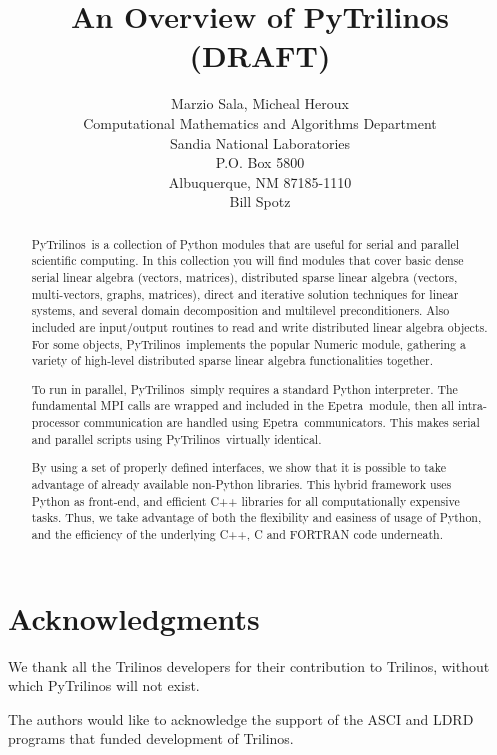 \documentclass[10pt,relax]{SANDreport}
\author{Marzio Sala, Micheal Heroux\\
Computational Mathematics and Algorithms Department \\
Sandia National Laboratories \\
P.O. Box 5800 \\
Albuquerque, NM 87185-1110 \\[10pt]
Bill Spotz \\[10pt]
}
\title{An Overview of PyTrilinos (DRAFT)}
\newcommand{\PyTrilinos}{{PyTrilinos}}
\newcommand{\epetra}{{Epetra}}
\begin{document}
\maketitle

\begin{abstract}
\PyTrilinos\ is a collection of Python modules that are useful for serial and
parallel scientific
computing. In this collection you will find modules that cover basic
dense serial linear algebra (vectors, matrices), 
distributed sparse linear algebra (vectors, multi-vectors, graphs, matrices), 
direct and iterative solution techniques for linear systems, and several
domain decomposition and multilevel
preconditioners. Also included are input/output routines to read and write
distributed linear algebra objects.
For some objects, \PyTrilinos\ implements the popular Numeric module, gathering a variety of
high-level distributed sparse linear algebra functionalities together.

To run in parallel, \PyTrilinos\ simply requires a standard Python interpreter.
The fundamental MPI calls are wrapped and included in the \epetra\ module, then
all intra-processor communication are handled using \epetra\ communicators. This
makes serial and parallel scripts using \PyTrilinos\ virtually identical.

By using a set of properly defined interfaces, we show that it is possible to
take advantage of already available non-Python libraries. This hybrid framework
uses Python as front-end, and efficient C++ libraries for all computationally
expensive tasks. Thus, we take advantage of both the flexibility and easiness
of usage of Python, and the efficiency of the underlying C++, C and FORTRAN
code underneath. 
\end{abstract}

\clearpage
\section*{Acknowledgments}
We thank all the Trilinos developers for their contribution to Trilinos,
  without which PyTrilinos will not exist.

The authors would like to acknowledge the support of the ASCI and LDRD programs
that funded development of Trilinos.

\medskip

\SANDmain

\tableofcontents
\newpage

\end{document}
